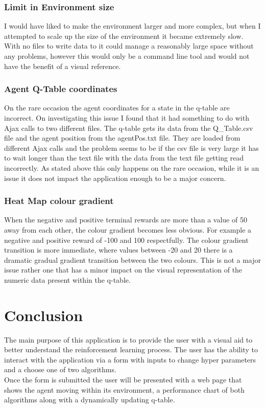 \subsection{Limit in Environment size}
I would have liked to make the environment larger and more complex, but when I attempted to scale up the size of the environment it became extremely slow. With no files to write data to it could manage a reasonably large space without any problems, however this would only be a command line tool and would not have the benefit of a visual reference. 

\subsection{Agent Q-Table coordinates}
On the rare occasion the agent coordinates for a state in the q-table are incorrect. On investigating this issue I found that it had something to do with Ajax calls to two different files. The q-table gets its data from the Q\_Table.csv file and the agent position from the agentPos.txt file. They are loaded from different Ajax calls and the problem seems to be if the csv file is very large it has to wait longer than the text file with the data from the text file getting read incorrectly. As stated above this only happens on the rare occasion, while it is an issue it does not impact the application enough to be a major concern.
\subsection{Heat Map colour gradient}
When the negative and positive terminal rewards are more than a value of 50 away from each other, the colour gradient becomes less obvious. For example a negative and positive reward of -100 and 100 respectfully. The colour gradient transition is more immediate, where values between -20 and 20 there is a dramatic gradual gradient transition between the two colours. This is not a major issue rather one that has a minor impact on the visual representation of the numeric data present within the q-table.
\chapter{Conclusion}
The main purpose of this application is to provide the user with a visual aid to better understand the reinforcement learning process. The user has the ability to interact with the application via a form with inputs to change hyper parameters and a choose one of two algorithms.\\ Once the form is submitted the user will be presented with a web page that shows the agent moving within its environment, a performance chart of both algorithms along with a dynamically updating q-table.

